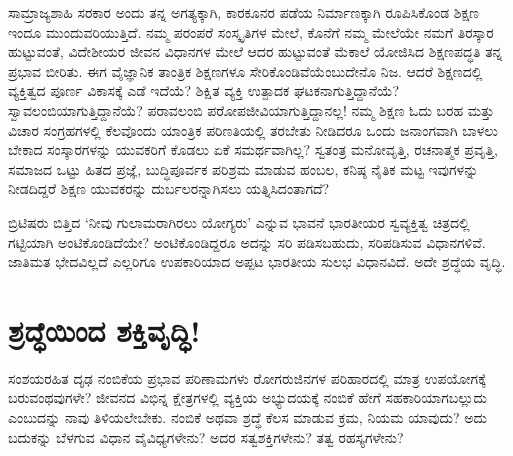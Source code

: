ಸಾಮ್ರಾಜ್ಯಶಾಹಿ ಸರಕಾರ ಅಂದು ತನ್ನ ಅಗತ್ಯಕ್ಕಾಗಿ, ಕಾರಕೂನರ ಪಡೆಯ ನಿರ್ಮಾಣಕ್ಕಾಗಿ ರೂಪಿಸಿಕೊಂಡ ಶಿಕ್ಷಣ ಇಂದೂ ಮುಂದುವರಿಯುತ್ತಿದೆ. ನಮ್ಮ ಪರಂಪರೆ ಸಂಸ್ಕೃತಿಗಳ ಮೇಲೆ, ಕೊನೆಗೆ ನಮ್ಮ ಮೇಲೆಯೇ ನಮಗೆ ತಿರಸ್ಕಾರ ಹುಟ್ಟುವಂತೆ, ವಿದೇಶೀಯರ ಜೀವನ ವಿಧಾನಗಳ ಮೇಲೆ ಆದರ ಹುಟ್ಟುವಂತೆ ಮೆಕಾಲೆ ಯೋಜಿಸಿದ ಶಿಕ್ಷಣಪದ್ಧತಿ ತನ್ನ ಪ್ರಭಾವ ಬೀರಿತು. ಈಗ ವೈಜ್ಞಾನಿಕ ತಾಂತ್ರಿಕ ಶಿಕ್ಷಣಗಳೂ ಸೇರಿಕೊಂಡಿವೆಯೆಂಬುದೇನೊ ನಿಜ. ಆದರೆ ಶಿಕ್ಷಣದಲ್ಲಿ ವ್ಯಕ್ತಿತ್ವದ ಪೂರ್ಣ ವಿಕಾಸಕ್ಕೆ ಎಡೆ ಇದೆಯೆ? ಶಿಕ್ಷಿತ ವ್ಯಕ್ತಿ ಉತ್ಪಾದಕ ಘಟಕನಾಗುತ್ತಿದ್ದಾನೆಯೆ? ಸ್ವಾವಲಂಬಿಯಾಗುತ್ತಿದ್ದಾನೆಯೆ? ಪರಾವಲಂಬಿ ಪರೋಪಜೀವಿಯಾಗುತ್ತಿದ್ದಾನಲ್ಲ! ನಮ್ಮ ಶಿಕ್ಷಣ ಓದು ಬರಹ ಮತ್ತು ವಿಚಾರ ಸಂಗ್ರಹಗಳಲ್ಲಿ ಕೆಲವೊಂದು ಯಾಂತ್ರಿಕ ಪರಿಣತಿಯಲ್ಲಿ ತರಬೇತು ನೀಡಿದರೂ ಒಂದು ಜನಾಂಗವಾಗಿ ಬಾಳಲು ಬೇಕಾದ ಸಂಸ್ಕಾರಗಳನ್ನು ಯುವಕರಿಗೆ ಕೊಡಲು ಏಕೆ ಸಮರ್ಥವಾಗಿಲ್ಲ? ಸ್ವತಂತ್ರ ಮನೋವೃತ್ತಿ, ರಚನಾತ್ಮಕ ಪ್ರವೃತ್ತಿ, ಸಮಾಜದ ಒಟ್ಟು ಹಿತದ ಪ್ರಜ್ಞೆ, ಬುದ್ಧಿಪೂರ್ವಕ ಪರಿಶ್ರಮ ಮಾಡುವ ಹಂಬಲ, ಕನಿಷ್ಠ ನೈತಿಕ ಮಟ್ಟ ಇವುಗಳನ್ನು ನೀಡದಿದ್ದರೆ ಶಿಕ್ಷಣ ಯುವಕರನ್ನು ದುರ್ಬಲರನ್ನಾಗಿಸಲು ಯತ್ನಿಸಿದಂತಾಗದೆ?

ಬ್ರಿಟಿಷರು ಬಿತ್ತಿದ ‘ನೀವು ಗುಲಾಮರಾಗಿರಲು ಯೋಗ್ಯರು’ ಎನ್ನುವ ಭಾವನೆ ಭಾರತೀಯರ ಸ್ವವ್ಯಕ್ತಿತ್ವ ಚಿತ್ರದಲ್ಲಿ ಗಟ್ಟಿಯಾಗಿ ಅಂಟಿಕೊಂಡಿದೆಯೇ? ಅಂಟಿಕೊಂಡಿದ್ದರೂ ಅದನ್ನು ಸರಿ ಪಡಿಸಬಹುದು, ಸರಿಪಡಿಸುವ ವಿಧಾನಗಳಿವೆ. ಜಾತಿಮತ ಭೇದವಿಲ್ಲದೆ ಎಲ್ಲರಿಗೂ ಉಪಕಾರಿಯಾದ ಅಪ್ಪಟ ಭಾರತೀಯ ಸುಲಭ ವಿಧಾನವಿದೆ. ಅದೇ ಶ್ರದ್ಧೆಯ ವೃದ್ಧಿ.


\section*{ಶ್ರದ್ಧೆಯಿಂದ ಶಕ್ತಿವೃದ್ಧಿ!}


ಸಂಶಯರಹಿತ ದೃಢ ನಂಬಿಕೆಯ ಪ್ರಭಾವ ಪರಿಣಾಮಗಳು ರೋಗರುಜಿನಗಳ ಪರಿಹಾರ\-ದಲ್ಲಿ ಮಾತ್ರ ಉಪಯೋಗಕ್ಕೆ ಬರುವಂಥವುಗಳೇ? ಜೀವನದ ವಿಭಿನ್ನ ಕ್ಷೇತ್ರಗಳಲ್ಲಿ ವ್ಯಕ್ತಿಯ ಅಭ್ಯುದಯಕ್ಕೆ ನಂಬಿಕೆ ಹೇಗೆ ಸಹಕಾರಿಯಾಗಬಲ್ಲುದು ಎಂಬುದನ್ನು ನಾವು ತಿಳಿಯಲೇಬೇಕು. ನಂಬಿಕೆ ಅಥವಾ ಶ್ರದ್ಧೆ ಕೆಲಸ ಮಾಡುವ ಕ್ರಮ, ನಿಯಮ ಯಾವುದು? ಅದು ಬದುಕನ್ನು ಬೆಳಗುವ ವಿಧಾನ ವೈವಿಧ್ಯಗಳೇನು? ಅದರ ಸತ್ವಶಕ್ತಿಗಳೇನು? ತತ್ವ ರಹಸ್ಯಗಳೇನು?


